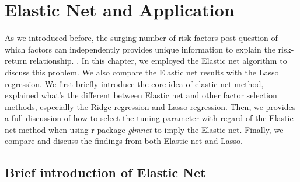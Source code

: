 \chapter{Elastic Net and Application}\label{Empirical:Elastic_net}
As we introduced before, the surging number of risk factors post question of which factors can independently provides unique information to explain the risk-return relationship. \cite{Cochrane2011}.
In this chapter, we employed the Elastic net algorithm to discuss this problem.
We also compare the Elastic net results with the Lasso regression.
We first briefly introduce the core idea of elastic net method, explained what's the different between Elastic net and other factor selection methods, especially the Ridge regression and Lasso regression.
Then, we provides a full discussion of how to select the tuning parameter with regard of the Elastic net method when using r package \textit{glmnet} to imply the Elastic net.
Finally, we compare and discuss the findings from both Elastic net and Lasso.


\section{Brief introduction of Elastic Net} \label{Elastic_Net}

